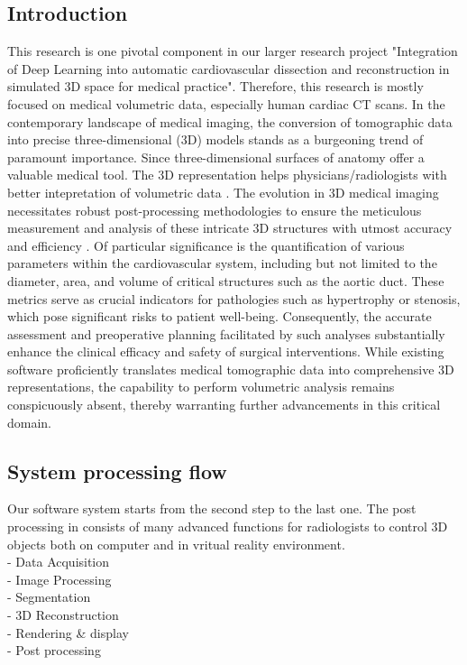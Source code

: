 \documentclass[11pt]{article}
\begin{document}
\begin{multicols}{2} 
\section{Introduction}
This research is one pivotal component in our larger research project "Integration of Deep Learning into automatic cardiovascular dissection and reconstruction in simulated 3D space for medical practice". Therefore, this research is mostly focused on medical volumetric data, especially human cardiac CT scans. In the contemporary landscape of medical imaging, the conversion of tomographic data into precise three-dimensional (3D) models stands as a burgeoning trend of paramount importance. Since three-dimensional surfaces of anatomy offer a valuable medical tool. The 3D representation helps physicians/radiologists with better intepretation of volumetric data \cite{loren}. The evolution in 3D medical imaging necessitates robust post-processing methodologies to ensure the meticulous measurement and analysis of these intricate 3D structures with utmost accuracy and efficiency \cite{intrinsic}. Of particular significance is the quantification of various parameters within the cardiovascular system, including but not limited to the diameter, area, and volume of critical structures such as the aortic duct. These metrics serve as crucial indicators for pathologies such as hypertrophy or stenosis, which pose significant risks to patient well-being. Consequently, the accurate assessment and preoperative planning facilitated by such analyses substantially enhance the clinical efficacy and safety of surgical interventions. While existing software proficiently translates medical tomographic data into comprehensive 3D representations, the capability to perform volumetric analysis remains conspicuously absent, thereby warranting further advancements in this critical domain.

\subsection{System processing flow}
Our software system starts from the second step to the last one. The post processing in \cite{vascular} consists of many advanced functions for radiologists to control 3D objects both on computer and in vritual reality environment. \\
- Data Acquisition \\ 
- Image Processing \\
- Segmentation \\ 
- 3D Reconstruction \\ 
- Rendering \& display \\
- Post processing 


\end{multicols}
\end{document}
